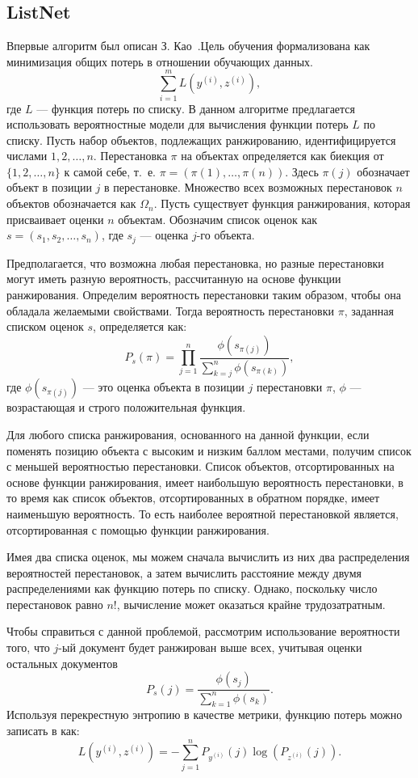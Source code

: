 \subsection{ListNet}
Впервые алгоритм был описан З. Као~\cite{ListNet}.Цель обучения формализована как минимизация общих потерь в отношении обучающих данных. 
\[
\sum_{i=1}^m L(y^{(i)}, z^{(i)}),
\]
где $L$ --- функция потерь по списку.
В данном алгоритме предлагается использовать вероятностные модели для вычисления функции потерь $L$ по списку.
Пусть набор объектов, подлежащих ранжированию, идентифицируется числами $1, 2, \dots, n$. Перестановка $\pi$ на объектах определяется как биекция от $\{1, 2, \dots, n\}$ к самой себе, т.~е. $\pi=(\pi(1), \dots, \pi(n))$. Здесь $\pi(j)$ обозначает объект в позиции $j$ в перестановке. Множество всех возможных перестановок $n$ объектов обозначается как $\Omega_n$. Пусть существует функция ранжирования, которая присваивает
оценки $n$ объектам. Обозначим список оценок как $s = (s_1, s_2, \dots, s_n)$, где $s_j$ --- оценка $j$-го объекта. 

Предполагается, что возможна любая перестановка, но разные перестановки могут иметь разную вероятность, рассчитанную на основе функции ранжирования. Определим вероятность перестановки таким образом, чтобы она обладала желаемыми свойствами. Тогда вероятность перестановки $\pi$, заданная списком оценок $s$, определяется как:
\[
P_s(\pi)=\prod_{j=1}^n \frac{\phi(s_{\pi(j)})}{\sum_{k=j}^n \phi(s_{\pi(k)})},
\]
где $\phi(s_{\pi(j)})$ --- это оценка объекта в позиции $j$ перестановки $\pi$, $\phi$ --- возрастающая и строго положительная функция.

Для любого списка ранжирования, основанного на данной функции, если поменять позицию объекта с высоким и низким баллом местами, получим список с меньшей вероятностью перестановки. Список объектов, отсортированных на основе функции ранжирования, имеет наибольшую вероятность перестановки, в то время как список объектов, отсортированных в обратном порядке, имеет наименьшую вероятность. То есть наиболее вероятной перестановкой является, отсортированная с помощью функции ранжирования.

Имея два списка оценок, мы можем сначала вычислить из них два распределения вероятностей перестановок, а затем вычислить расстояние между двумя распределениями как функцию потерь по списку. Однако, поскольку число перестановок равно $n!$, вычисление может оказаться крайне трудозатратным.

Чтобы справиться с данной проблемой, рассмотрим использование вероятности того, что $j$-ый документ будет ранжирован выше всех, учитывая оценки остальных документов
\[
P_s(j)=\frac{\phi(s_j)}{\sum_{k=1}^n \phi(s_k)} .
\]
Используя перекрестную энтропию в качестве метрики, функцию потерь можно записать в как:
\[
L(y^{(i)}, z^{(i)})=-\sum_{j=1}^n P_{y^{(i)}}(j) \log (P_{z^{(i)}}(j)).
\]

